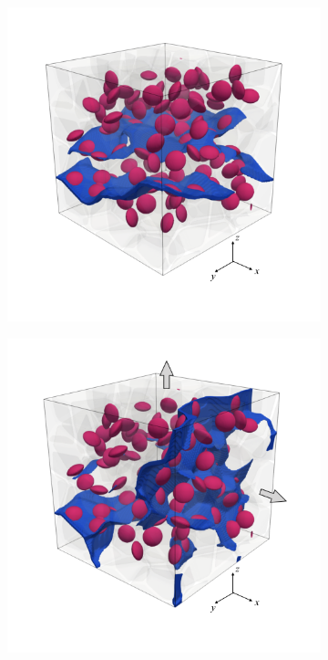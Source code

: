 \begin{figure}[!htb]
  \centering
  \begin{subfigure}{0.32\textwidth}
    \centering
    \includegraphics[width=\textwidth]{Chapter3/figures/b100_end}
    \caption{}
    \label{b100_load1}
  \end{subfigure}
  \begin{subfigure}{0.32\textwidth}
    \centering
    \includegraphics[width=\textwidth]{Chapter3/figures/b100_end_yz}

\end{subfigure}
\end{figure}

